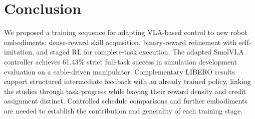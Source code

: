 \section{Conclusion}\label{sec:conclusion}
We proposed a training sequence for adapting VLA-based control to new robot embodiments: dense-reward skill acquisition, binary-reward refinement with self-imitation, and staged RL for complete-task execution. The adapted SmolVLA controller achieves 61.43\% strict full-task success in simulation development evaluation on a cable-driven manipulator. Complementary LIBERO results support structured intermediate feedback with an already trained policy, linking the studies through task progress while leaving their reward density and credit assignment distinct.  Controlled schedule comparisons and further embodiments are needed to establish the contribution and generality of each training stage.
